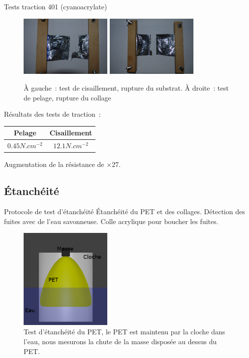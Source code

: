 \begin{frame}{Tests traction 401 (cyanoacrylate)}
  \begin{figure}[!t]
    \centering
    \includegraphics[width=4.5cm]{../Images/test_cisaillement.png}
    \includegraphics[width=4.5cm]{../Images/test_pelage.png}
    
    \caption{À gauche~: test de cisaillement, rupture du substrat. À droite~: test de pelage, rupture du collage}
  \end{figure}
  Résultats des tests de traction~:
  \begin{center}
    \begin{tabular}{|c|c|}
      \hline
      Pelage & Cisaillement \\
      \hline
      $0.45 N.cm^{-2}$ & $12.1 N.cm^{-2}$ \\
      \hline
    \end{tabular}
  \end{center}
  Augmentation de la résistance de $\times 27$.
\end{frame}


\subsection{Étanchéité}
\begin{frame}{Protocole de test d'étanchéité}
 Étanchéité du PET et des collages. Détection des fuites avec de l'eau savonneuse. Colle acrylique pour boucher les fuites.

\begin{figure}[H]
	\centering
	\includegraphics[width=4.5cm]{../Images/etancheite.png}
	\caption{Test d'étanchéité du PET, le PET est maintenu par la cloche dans l'eau, nous mesurons la chute de la masse disposée au dessus du PET.}
\end{figure}

\end{frame}

